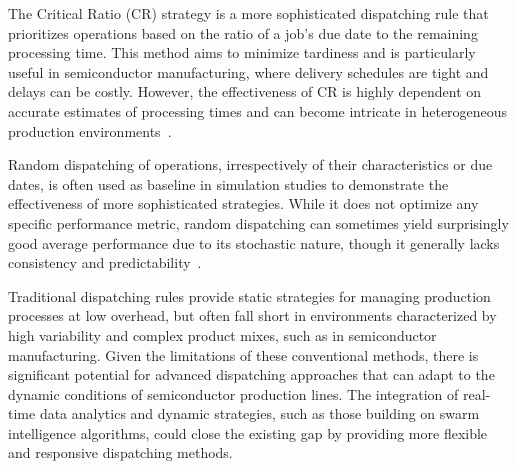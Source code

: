 The Critical Ratio (CR) strategy is a more sophisticated dispatching rule that prioritizes operations based on the ratio of a job's due date to the remaining processing time. This method aims to minimize tardiness and is particularly useful in semiconductor manufacturing, where delivery schedules are tight and delays can be costly. However, the effectiveness of CR is highly dependent on accurate estimates of processing times and can become intricate in heterogeneous production environments~\cite{baker1974}. 

Random dispatching of operations, irrespectively of their characteristics or due dates, is often used as baseline in simulation studies to demonstrate the effectiveness of more sophisticated strategies. While it does not optimize any specific performance metric, random dispatching can sometimes yield surprisingly good average performance due to its stochastic nature, though it generally lacks consistency and predictability~\cite{blackstone1982}. 

Traditional dispatching rules provide static strategies for managing production processes at low overhead, but often fall short in environments characterized by high variability and complex product mixes, such as in semiconductor manufacturing. %
Given the limitations of these conventional methods, there is significant potential for advanced dispatching approaches that can adapt to the dynamic conditions of semiconductor production lines. The integration of real-time data analytics and dynamic strategies, such as those building on swarm intelligence algorithms, could close the existing gap by providing more flexible and responsive dispatching methods.

























